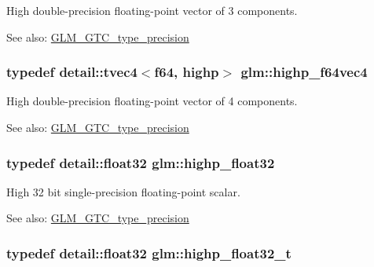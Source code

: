 High double-precision floating-point vector of 3 components. \begin{Desc}
\item[See also:]\hyperlink{group__gtc__type__precision}{GLM\_\-GTC\_\-type\_\-precision} \end{Desc}
\hypertarget{group__gtc__type__precision_g1e9d8145fb9521701a5eeb6df5754184}{
\subsubsection[highp\_\-f64vec4]{\setlength{\rightskip}{0pt plus 5cm}typedef detail::tvec4$<$f64, highp$>$ {\bf glm::highp\_\-f64vec4}}}
\label{group__gtc__type__precision_g1e9d8145fb9521701a5eeb6df5754184}


High double-precision floating-point vector of 4 components. \begin{Desc}
\item[See also:]\hyperlink{group__gtc__type__precision}{GLM\_\-GTC\_\-type\_\-precision} \end{Desc}
\hypertarget{group__gtc__type__precision_g91af7513c1102410646f2c435ca29be5}{
\subsubsection[highp\_\-float32]{\setlength{\rightskip}{0pt plus 5cm}typedef detail::float32 {\bf glm::highp\_\-float32}}}
\label{group__gtc__type__precision_g91af7513c1102410646f2c435ca29be5}


High 32 bit single-precision floating-point scalar. \begin{Desc}
\item[See also:]\hyperlink{group__gtc__type__precision}{GLM\_\-GTC\_\-type\_\-precision} \end{Desc}
\hypertarget{group__gtc__type__precision_g4e16a7818d09e2da3b81765999f23928}{
\subsubsection[highp\_\-float32\_\-t]{\setlength{\rightskip}{0pt plus 5cm}typedef detail::float32 {\bf glm::highp\_\-float32\_\-t}}}
\label{group__gtc__type__precision_g4e16a7818d09e2da3b81765999f23928}


